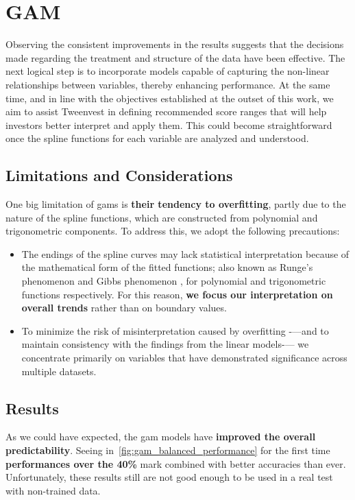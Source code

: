 \documentclass[11pt,english,a4paper,hidelinks]{book}
\begin{document}
\section{GAM}

Observing the consistent improvements in the results suggests that the decisions made regarding the treatment and structure of the data have been effective. The next logical step is to incorporate models capable of capturing the non-linear relationships between variables, thereby enhancing performance. At the same time, and in line with the objectives established at the outset of this work, we aim to assist Tweenvest in defining recommended score ranges that will help investors better interpret and apply them. This could become straightforward once the spline functions for each variable are analyzed and understood.

\subsection{Limitations and Considerations}

\noindent One big limitation of \acrshort{gam}s is \textbf{their tendency to overfitting}, partly due to the nature of the spline functions, which are constructed from polynomial and trigonometric components. To address this, we adopt the following precautions:
\begin{itemize}
    \item The endings of the spline curves may lack statistical interpretation because of the mathematical form of the fitted functions; also known as Runge's phenomenon \cite{runge1901empirische} and Gibbs phenomenon \cite{carslaw1930fourier}, for polynomial and trigonometric functions respectively. For this reason, \textbf{we focus our interpretation on overall trends} rather than on boundary values.
    \item To minimize the risk of misinterpretation caused by overfitting -—and to maintain consistency with the findings from the linear models-— we concentrate primarily on variables that have demonstrated significance across multiple datasets.
\end{itemize}

\subsection{Results}

\noindent As we could have expected, the \acrshort{gam} models have \textbf{improved the overall predictability}. Seeing in~\ref{fig:gam_balanced_performance} for the first time \textbf{performances over the 40\%} mark combined with better accuracies than ever. Unfortunately, these results still are not good enough to be used in a real test with non-trained data.
\end{document}
